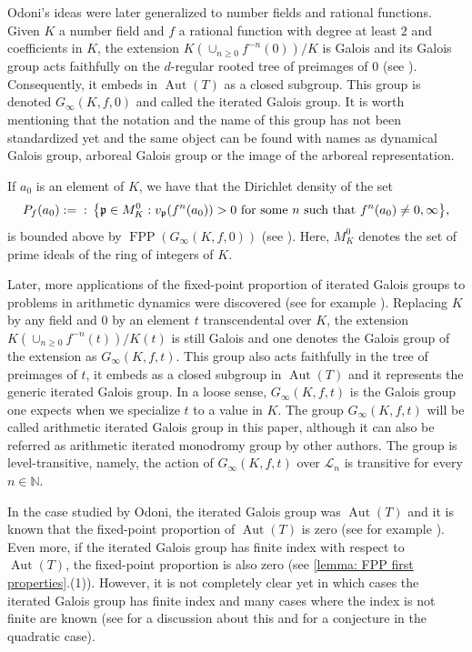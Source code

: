 \documentclass{amsart}
\def\set#1{{\def\st{\;:\;}\left\{#1\right\}}}
\def\NN{\mathbb N}
\DeclareMathOperator{\Aut}{Aut}
\DeclareMathOperator{\FPP}{FPP}
\DeclareMathOperator{\st}{st}
\begin{document}
Odoni’s ideas were later generalized to number fields and  rational functions. Given $K$ a number field and $f$ a rational function with degree at least $2$ and coefficients in $K$, the extension $K(\cup_{n \geq 0} f^{-n}(0))/K$ is Galois and its Galois group acts faithfully on the $d$-regular rooted tree of preimages of $0$ (see \cite{Jones2014}). Consequently, it embeds in $\Aut(T)$ as a closed subgroup. This group is denoted $G_\infty(K,f,0)$ and called the iterated Galois group. It is worth mentioning that the notation and the name of this group has not been standardized yet and the same object can be found with names as dynamical Galois group, arboreal Galois group or the image of the arboreal representation. 

If $a_0$ is an element of $K$, we have that the Dirichlet density of the set $$P_f(a_0) := \set{\mathfrak{p} \in M_K^0: v_\mathfrak{p}(f^n(a_0)) > 0 \text{ for some $n$ such that $f^n(a_0) \neq 0, \infty$}},$$ is bounded above by $\FPP(G_\infty(K,f,0))$ (see \cite[Theorem 6.1]{JonesManes2012}). Here, $M_K^0$ denotes the set of prime ideals of the ring of integers of $K$. 

Later, more applications of the fixed-point proportion of iterated Galois groups to problems in arithmetic dynamics were discovered (see for example \cite{BridyJones2022, Juul2014}). Replacing $K$ by any field and $0$ by an element $t$ transcendental over $K$, the extension $K(\cup_{n \geq 0}f^{-n}(t))/K(t)$ is still Galois and one denotes the Galois group of the extension as $G_\infty(K,f,t)$. This group also acts faithfully in the tree of preimages of $t$, it embeds as a closed subgroup in $\Aut(T)$ and it represents the generic iterated Galois group. In a loose sense, $G_\infty(K,f,t)$ is the Galois group one expects when we specialize $t$ to a value in $K$. The group $G_\infty(K,f,t)$ will be called arithmetic iterated Galois group in this paper, although it can also be referred as arithmetic iterated monodromy group by other authors. The group is level-transitive, namely, the action of $G_\infty(K,f,t)$ over $\mathcal{L}_n$ is transitive for every $n \in \NN$.

In the case studied by Odoni, the iterated Galois group was $\Aut(T)$ and it is known that the fixed-point proportion of $\Aut(T)$ is zero (see for example \cite[Corollary 2.6]{AbertVirag2004}). Even more, if the iterated Galois group has finite index with respect to $\Aut(T)$, the fixed-point proportion is also zero (see \cref{lemma: FPP first properties}.(1)). However, it is not completely clear yet in which cases the iterated Galois group has finite index and many cases where the index is not finite are known (see \cite[Section 3]{Jones2014} for a discussion about this and \cite[Conjecture 3.11]{Jones2014} for a conjecture in the quadratic case).  
\end{document}
